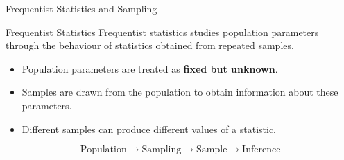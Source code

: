 \documentclass{beamer}
\begin{document}

\begin{frame}{Frequentist Statistics and Sampling}

\begin{block}{Frequentist Statistics}
Frequentist statistics studies population parameters through
the behaviour of statistics obtained from repeated samples.
\end{block}

\begin{itemize}
    \item Population parameters are treated as \textbf{fixed but unknown}.
    \item Samples are drawn from the population to obtain information
          about these parameters.
    \item Different samples can produce different values of a statistic.
\end{itemize}

\[
\boxed{
\text{Population}
\longrightarrow
\text{Sampling}
\longrightarrow
\text{Sample}
\longrightarrow
\text{Inference}
}
\]

\end{frame}

\end{document}
